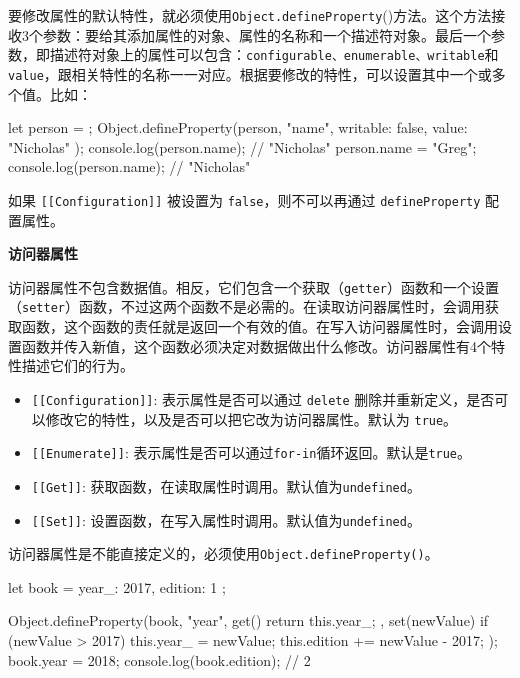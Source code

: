 要修改属性的默认特性，就必须使用\texttt{Object.defineProperty}()方法。这个方法接收3个参数：要给其添加属性的对象、属性的名称和一个描述符对象。最后一个参数，即描述符对象上的属性可以包含：\texttt{configurable、enumerable、writable}和\texttt{value}，跟相关特性的名称一一对应。根据要修改的特性，可以设置其中一个或多个值。比如：

\begin{JavaScript}
let person = {};  
Object.defineProperty(person, "name", {   
    writable: false,   
    value: "Nicholas" 
}); 
console.log(person.name); // "Nicholas" 
person.name = "Greg"; 
console.log(person.name); // "Nicholas" 
\end{JavaScript}

如果 \texttt{[[Configuration]]} 被设置为 \texttt{false}，则不可以再通过 \texttt{defineProperty} 配置属性。

\noindent\textbf{访问器属性}

访问器属性不包含数据值。相反，它们包含一个获取（\texttt{getter}）函数和一个设置（\texttt{setter}）函数，不过这两个函数不是必需的。在读取访问器属性时，会调用获取函数，这个函数的责任就是返回一个有效的值。在写入访问器属性时，会调用设置函数并传入新值，这个函数必须决定对数据做出什么修改。访问器属性有4个特性描述它们的行为。

\begin{itemize}
    \item \texttt{[[Configuration]]}: 表示属性是否可以通过 \texttt{delete} 删除并重新定义，是否可以修改它的特性，以及是否可以把它改为访问器属性。默认为 \texttt{true}。
    \item \texttt{[[Enumerate]]}: 表示属性是否可以通过\texttt{for-in}循环返回。默认是\texttt{true}。
    \item \texttt{[[Get]]}: 获取函数，在读取属性时调用。默认值为\texttt{undefined}。
    \item \texttt{[[Set]]}: 设置函数，在写入属性时调用。默认值为\texttt{undefined}。
\end{itemize}

访问器属性是不能直接定义的，必须使用\texttt{Object.defineProperty()}。

\begin{JavaScript}
let book = {    
    year_: 2017,   
    edition: 1
}; 

Object.defineProperty(book, "year", {
    get() {     
        return this.year_;   
    },   
    set(newValue) {     
        if (newValue > 2017) {       
            this.year_ = newValue;       
            this.edition += newValue - 2017;     
        }   
    } 
}); 
book.year = 2018; 
console.log(book.edition); // 2 
\end{JavaScript}

